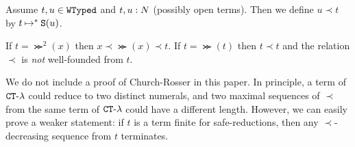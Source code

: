 \begin{definition}
Assume $t, u \in {\tt WTyped}$ and $t, u :{N}$ (possibly open terms).
Then we define $u \prec t$ by $t \mathbin{\mapsto}^{*} {\tt S}(u)$. 
\end{definition}

\begin{example}
If $t = \Succ^2(x)$ then $x \prec \Succ(x) \prec t$. 
If $t  = \Succ(t)$ then $t \prec t$ and the relation $\prec$ is \emph{not} 
well-founded from $t$.
\end{example}

We do not include a proof of Church-Rosser in this paper. In principle, 
a term of ${ {\tt CT}\mbox{-}\lambda}$ could reduce to two distinct numerals, and two maximal
sequences of $\prec$ from the same term of ${ {\tt CT}\mbox{-}\lambda}$ 
could have a different length. However, 
we can easily prove a weaker statement: 
if $t$ is a term finite for safe-reductions, 
then any $\prec$-decreasing sequence from $t$ terminates.


